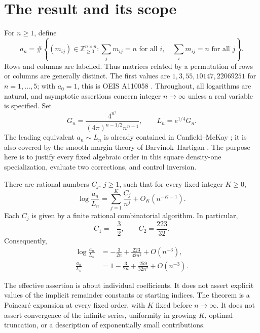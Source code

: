 \section{The result and its scope}\label{sqt:sec:results}
For $n\geq1$, define
\[
a_n=\#\left\{(m_{ij})\in\mathbb Z_{\geq0}^{n\times n}:
 \sum_jm_{ij}=n\text{ for all }i,\quad
 \sum_im_{ij}=n\text{ for all }j\right\}.
\]
Rows and columns are labelled. Thus matrices related by a permutation of rows or columns are generally distinct. The first values are $1,3,55,10147,22069251$ for $n=1,\ldots,5$; with $a_0=1$, this is OEIS A110058 \cite{oeis}. Throughout, all logarithms are natural, and asymptotic assertions concern integer $n\to\infty$ unless a real variable is specified. Set
\begin{equation}\label{sqt:eq:leading}
G_n=\frac{4^{n^2}}{(4\pi)^{n-1/2}n^{n-1}},\qquad L_n=e^{1/4}G_n.
\end{equation}
The leading equivalent $a_n\sim L_n$ is already contained in Canfield--McKay \cite{CM}; it is also covered by the smooth-margin theory of Barvinok--Hartigan \cite{BH}. The purpose here is to justify every fixed algebraic order in this square density-one specialization, evaluate two corrections, and control inversion.

\begin{theorem}\label{sqt:thm:main}
There are rational numbers $C_j$, $j\geq1$, such that for every fixed integer $K\geq0$,
\begin{equation}\label{sqt:eq:main}
\log\frac{a_n}{L_n}=\sum_{j=1}^{K}\frac{C_j}{n^j}+O_K(n^{-K-1}).
\end{equation}
Each $C_j$ is given by a finite rational combinatorial algorithm. In particular,
\begin{equation}\label{sqt:eq:two}
C_1=-\frac32,\qquad C_2=\frac{223}{32}.
\end{equation}
Consequently,
\begin{align}
\log\frac{a_n}{L_n}&=-\frac{3}{2n}+\frac{223}{32n^2}+O(n^{-3}),\label{sqt:eq:logtwo}\\
\frac{a_n}{L_n}&=1-\frac{3}{2n}+\frac{259}{32n^2}+O(n^{-3}).\label{sqt:eq:relativetwo}
\end{align}
\end{theorem}

The effective assertion is about individual coefficients. It does not assert explicit values of the implicit remainder constants or starting indices. The theorem is a Poincar\'e expansion at every fixed order, with $K$ fixed before $n\to\infty$. It does not assert convergence of the infinite series, uniformity in growing $K$, optimal truncation, or a description of exponentially small contributions.

